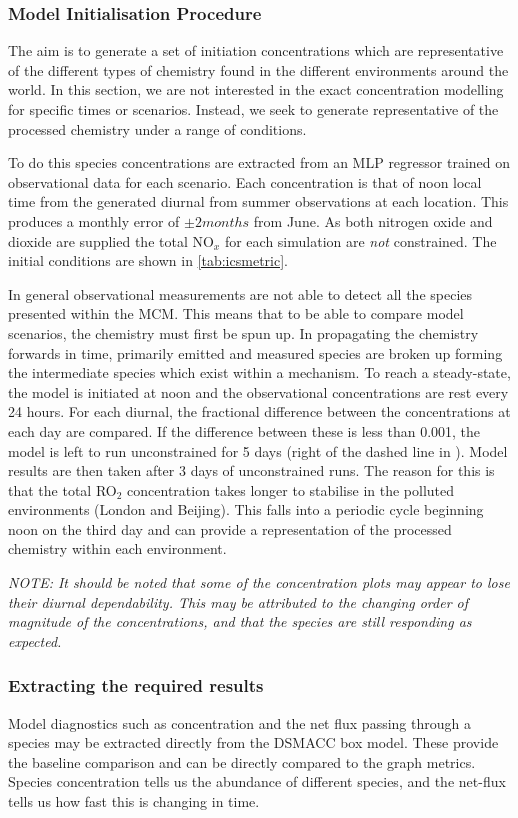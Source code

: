 \subsubsection{Model Initialisation Procedure}
The aim is to generate a set of initiation concentrations which are representative of the different types of chemistry found in the different environments around the world. In this section, we are not interested in the exact concentration modelling for specific times or scenarios. Instead, we seek to generate representative of the processed chemistry under a range of conditions. 

To do this species concentrations are extracted from an MLP regressor trained on observational data for each scenario. Each concentration is that of noon local time from the generated diurnal from summer observations at each location. This produces a monthly error of $\pm 2 months$ from June. As both nitrogen oxide and dioxide are supplied the total NO$_x$ for each simulation are \emph{not} constrained. The initial conditions are shown in \autoref{tab:icsmetric}.

In general observational measurements are not able to detect all the species presented within the MCM. This means that to be able to compare model scenarios, the chemistry must first be spun up. In propagating the chemistry forwards in time, primarily emitted and measured species are broken up forming the intermediate species which exist within a mechanism. To reach a steady-state, the model is initiated at noon and the observational concentrations are rest every 24 hours. For each diurnal, the fractional difference between the concentrations at each day are compared. If the difference between these is less than 0.001, the model is left to run unconstrained for 5 days (right of the dashed line in ). Model results are then taken after 3 days of unconstrained runs. The reason for this is that the total RO$_2$ concentration takes longer to stabilise in the polluted environments (London and Beijing). This falls into a periodic cycle beginning noon on the third day and can provide a representation of the processed chemistry within each environment. 

\textit{NOTE: It should be noted that some of the concentration plots may appear to lose their diurnal dependability. This may be attributed to the changing order of magnitude of the concentrations, and that the species are still responding as expected. }

\subsubsection{Extracting the required results}
Model diagnostics such as concentration and the net flux passing through a species may be extracted directly from the DSMACC box model. These provide the baseline comparison and can be directly compared to the graph metrics. Species concentration tells us the abundance of different species, and the net-flux tells us how fast this is changing in time. 

